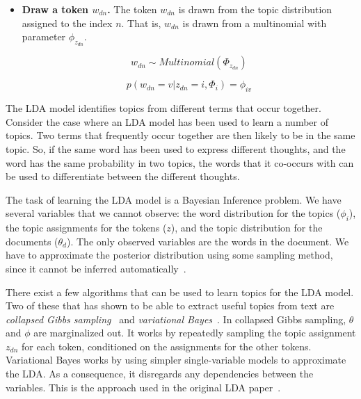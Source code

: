 \begin{itemize}
\begin{itemize}
            \item \textbf{Draw a token $w_{dn}$.}
                The token $w_{dn}$ is drawn from the topic distribution assigned to the index $n$.
                That is, $w_{dn}$ is drawn from a multinomial with parameter $\phi_{z_{dn}}$.

                \begin{equation}
                    w_{dn} \sim Multinomial(\Phi_{z_{dn}})
                \end{equation}

                \begin{equation}
                    p(w_{dn}=v|z_{dn}=i,\Phi_i) = \phi_{iv}
                \end{equation}

        \end{itemize}

\end{itemize}

The LDA model identifies topics from different terms that occur together.
Consider the case where an LDA model has been used to learn a number of topics.
Two terms that frequently occur together are then likely to be in the same topic.
So, if the same word has been used to express different thoughts, and the word has the same probability in two topics, the words that it co-occurs with can be used to differentiate between the different thoughts.

The task of learning the LDA model is a Bayesian Inference problem.
We have several variables that we cannot observe: the word distribution for the topics ($\phi_i$), the topic assignments for the tokens ($z$), and the topic distribution for the documents ($\theta_d$).
The only observed variables are the words in the document.
We have to approximate the posterior distribution using some sampling method, since it cannot be inferred automatically~\cite{LDA}.

There exist a few algorithms that can be used to learn topics for the LDA model. 
Two of these that has shown to be able to extract useful topics from text are \textit{collapsed Gibbs sampling}~\cite{collapsed-gibs} and \textit{variational Bayes}~\cite{LDA}.  
In collapsed Gibbs sampling, $\theta$ and $\phi$ are marginalized out.
It works by repeatedly sampling the topic assignment $z_{dn}$ for each token, conditioned on the assignments for the other tokens.
Variational Bayes works by using simpler single-variable models to approximate the LDA\@. 
As a consequence, it disregards any dependencies between the variables.
This is the approach used in the original LDA paper~\cite{LDA}.

